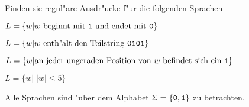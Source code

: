 Finden sie regul"are Ausdr"ucke f"ur die folgenden Sprachen
\begin{teilaufgaben}
\item $L=\{w|\text{$w$ beginnt mit {\tt 1} und endet mit {\tt 0}}\}$
\item $L=\{w|\text{$w$ enth"alt den Teilstring {\tt 0101}}\}$
\item $L=\{w|\text{an jeder ungeraden Position von $w$ befindet sich ein {\tt 1}}\}$
\item $L=\{w|\;|w|\le 5\}$
\end{teilaufgaben}
Alle Sprachen sind "uber dem Alphabet $\Sigma=\{{\tt 0},{\tt 1}\}$ zu
betrachten.


